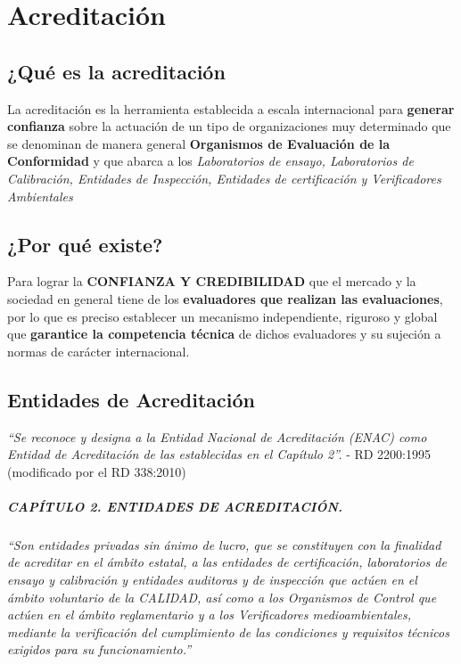 \chapter{Acreditación}
\section{¿Qué es la acreditación}
La acreditación es la herramienta establecida a escala internacional para \textbf{generar confianza} sobre la actuación de un tipo de organizaciones muy determinado que se denominan de manera general \textbf{Organismos de Evaluación de la Conformidad} y que abarca a los \textit{Laboratorios de ensayo, Laboratorios de Calibración, Entidades de Inspección, Entidades de certificación y Verificadores Ambientales}

\section{¿Por qué existe?}
Para lograr la \textbf{CONFIANZA Y CREDIBILIDAD} que el mercado y la sociedad en general tiene de los \textbf{evaluadores que realizan las evaluaciones}, por lo que es preciso establecer un mecanismo independiente, riguroso y global que \textbf{garantice la competencia técnica} de dichos evaluadores y su sujeción a normas de carácter internacional.

\section{Entidades de Acreditación}
\textit{``Se reconoce y designa a la Entidad Nacional de Acreditación (ENAC) como Entidad de Acreditación de las establecidas en el Capítulo 2''.} - RD 2200:1995 (modificado por el RD 338:2010)

\paragraph{CAPÍTULO 2. ENTIDADES DE ACREDITACIÓN.} \textit{``Son entidades privadas sin ánimo de lucro, que se constituyen con la finalidad de acreditar en el ámbito estatal, a las entidades de certificación, laboratorios de ensayo y calibración y entidades auditoras y de inspección que actúen en el ámbito voluntario de la CALIDAD, así como a los Organismos de Control que actúen en el ámbito reglamentario y a los Verificadores medioambientales, mediante la verificación del cumplimiento de las condiciones y requisitos técnicos exigidos para su funcionamiento.''}

